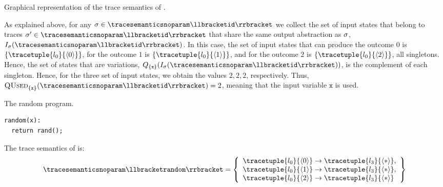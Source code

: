 \begin{example}
\begin{marginfigure}[*-1.5]
  \caption{Graphical representation of the trace semantics of .}
  \end{marginfigure}
  As explained above, for any $\deftrace\in \tracesemanticsnoparam\semanticsof{\texttt{id}}$ we collect the set of input states that belong to traces $\deftrace'\in\tracesemanticsnoparam\semanticsof{\texttt{id}}$ that share the same output abstraction as $\sigma$, \cf{} $I_{\deftrace}(\tracesemanticsnoparam\semanticsof{\texttt{id}})$.
  In this case, the set of input states that can produce the outcome $0$ is $\{\tracetuple{\locinit}{\langle 0\rangle}\}$, for the outcome $1$ is $\{\tracetuple{\locinit}{\langle 1\rangle}\}$, and for the outcome $2$ is $\{\tracetuple{\locinit}{\langle 2\rangle}\}$, all singletons.
  Hence, the set of states that are variations, \cf{} $Q_{\{\texttt{x}\}}(I_{\deftrace}(\tracesemanticsnoparam\semanticsof{\texttt{id}}))$, is the complement of each singleton.
  Hence, for the three set of input states, we obtain the values $2, 2, 2$, respectively.
  Thus, $\qusedname_{\{\texttt{x}\}}(\tracesemanticsnoparam\semanticsof{\texttt{id}})=2$, meaning that the input variable $\texttt{x}$ is used.

\begin{marginlisting}[*-3]
  \caption{The random program.}
  \vspace{15pt}
\begin{lstlisting}[language=customPython]
random(x):
  return rand();
  \end{lstlisting}
\end{marginlisting}
  The trace semantics of  is:
  \begin{align*}
    \tracesemanticsnoparam\semanticsof{\texttt{random}}
    =
    \left\{
      \begin{array}{l}
        \tracetuple{\locinit}{\langle 0\rangle}\rightarrow\tracetuple{\loc{3}}{\langle \anyvalue\rangle}, \\
        \tracetuple{\locinit}{\langle 1\rangle}\rightarrow\tracetuple{\loc{3}}{\langle \anyvalue\rangle}, \\
        \tracetuple{\locinit}{\langle 2\rangle}\rightarrow\tracetuple{\loc{3}}{\langle \anyvalue\rangle}
      \end{array}
    \right\}
  \end{align*}


\end{example}
